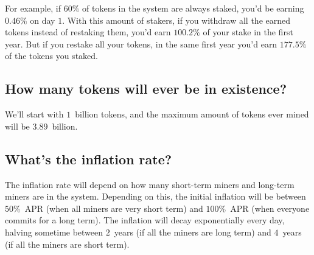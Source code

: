 \documentclass[longbibliography,nofootinbib,twocolumn]{revtex4-1}
\begin{document}
For example, if $60\%$ of tokens in the system are always staked, you'd be earning $0.46\%$ on day $1$.
With this amount of stakers, if you withdraw all the earned tokens instead of restaking them, you'd earn $100.2\%$ of your stake in the first year.
But if you restake all your tokens, in the same first year you'd earn $177.5\%$ of the tokens you staked.

\subsection{How many tokens will ever be in existence?}
We'll start with $1$~billion tokens, and the maximum amount of tokens ever mined will be $3.89$~billion.

\subsection{What's the inflation rate?}
The inflation rate will depend on how many short-term miners and long-term miners are in the system.
Depending on this, the initial inflation will be between $50\%$~APR (when all miners are very short term) and $100\%$~APR (when everyone commits for a long
term).
The inflation will decay exponentially every day, halving sometime between $2$~years (if all the miners are long term)
and $4$~years (if all the miners are short term).


\end{document}
